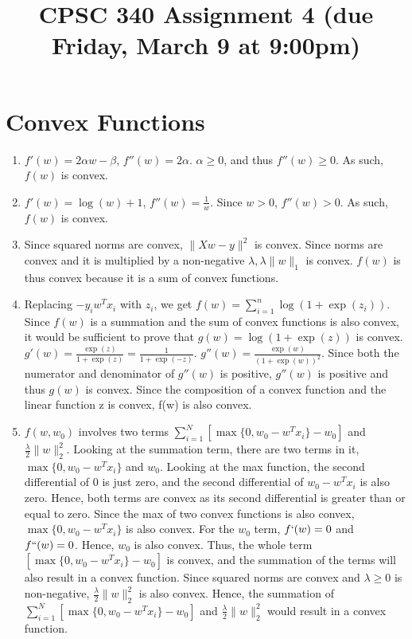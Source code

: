 \documentclass{article}
\def\norm#1{\|#1\|}
\def\enum#1{\begin{enumerate}#1\end{enumerate}}
\begin{document}
\title{CPSC 340 Assignment 4 (due Friday, March 9 at 9:00pm)}
\date{}
\maketitle

\vspace{-7em}

\section{Convex Functions}

\enum{
\item $f'(w) = 2\alpha w - \beta$, $f''(w) = 2\alpha$. $\alpha \geq 0$, and thus $f''(w) \geq 0$. As such, $f(w)$ is convex.
\item $f'(w) = \log(w) + 1$, $f''(w) = \frac{1}{w}$. Since $w > 0$, $f''(w) > 0$. As such, $f(w)$ is convex.
\item Since squared norms are convex, $\norm{Xw-y}^2$ is convex. Since norms are convex and it is multiplied by a non-negative $\lambda, \lambda\norm{w}_1$ is convex. $f(w)$ is thus convex because it is a sum of convex functions.
\item Replacing $-y_iw^Tx_i$ with $z_i$, we get $f(w) = \sum_{i=1}^n \log(1+\exp(z_i))$. Since $f(w)$ is a summation and the sum of convex functions is also convex, it would be sufficient to prove that $g(w) = \log(1+\exp(z))$ is convex. $g'(w) = \frac{\exp(z)}{1+\exp(z)} = \frac{1}{1+\exp(-z)}$. $g''(w) = \frac{\exp(w)}{(1 + \exp(w))^2}$. Since both the numerator and denominator of $g''(w)$ is positive, $g''(w)$ is positive and thus $g(w)$ is convex. Since the composition of a convex function and the linear function z is convex, f(w) is also convex.
\item $f(w,w_0)$ involves two terms $\sum_{i=1}^N[\max\{0,w_0 - w^Tx_i\} - w_0]$ and $\frac{\lambda}{2}\norm{w}_2^2$. Looking at the summation term, there are two terms in it, $\max\{0,w_0 - w^Tx_i\}$ and $w_0$. Looking at the max function, the second differential of 0 is just zero, and the second differential of $w_0 - w^Tx_i$ is also zero. Hence, both terms are convex as its second differential is greater than or equal to zero. Since the max of two convex functions is also convex, $\max\{0,w_0 - w^Tx_i\}$ is also convex. For the $w_0$ term, $f`(w) = 0$ and $f``(w) = 0$. Hence, $w_0$ is also convex. Thus, the whole term $[\max\{0,w_0 - w^Tx_i\} - w_0]$ is convex, and the summation of the terms will also result in a convex function. Since squared norms are convex and $\lambda \geq 0$ is non-negative, $\frac{\lambda}{2}\norm{w}_2^2$ is also convex. Hence, the summation of $\sum_{i=1}^N[\max\{0,w_0 - w^Tx_i\} - w_0]$ and $\frac{\lambda}{2}\norm{w}_2^2$ would result in a convex function.
}
\end{document}
